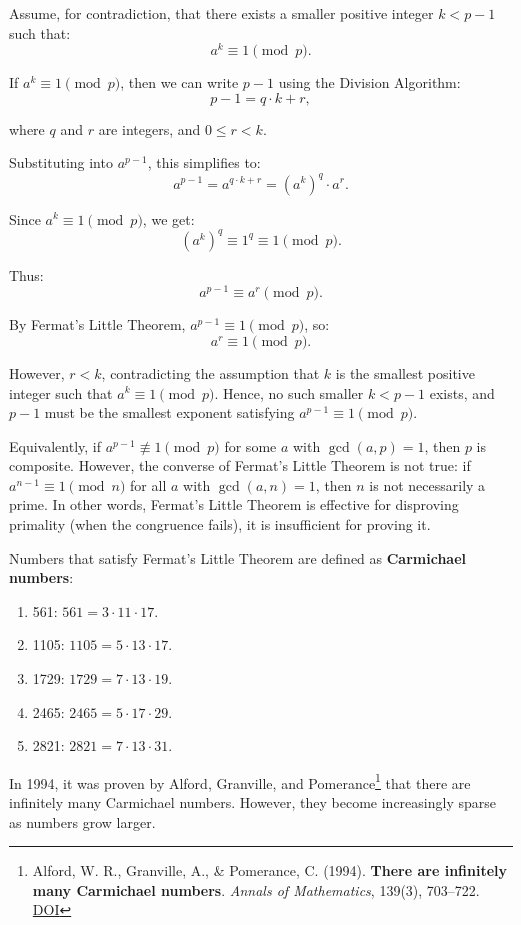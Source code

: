 \documentclass[
  letterpaper,
  DIV=11,
  numbers=noendperiod,
  oneside]{scrartcl}
\providecommand{\tightlist}{%
  \setlength{\itemsep}{0pt}\setlength{\parskip}{0pt}}\usepackage{longtable,booktabs,array}
\begin{document}
Assume, for contradiction, that there exists a smaller positive integer
\(k < p-1\) such that: \[
a^k \equiv 1 \pmod{p}.
\]

If \(a^k \equiv 1 \pmod{p}\), then we can write \(p-1\) using the
Division Algorithm: \[
p-1 = q \cdot k + r,
\]

where \(q\) and \(r\) are integers, and \(0 \leq r < k\).

Substituting into \(a^{p-1}\), this simplifies to: \[
a^{p-1} = a^{q \cdot k + r} = (a^k)^q \cdot a^r.
\]

Since \(a^k \equiv 1 \pmod{p}\), we get: \[
(a^k)^q \equiv 1^q \equiv 1 \pmod{p}.
\]

Thus: \[
a^{p-1} \equiv a^r \pmod{p}.
\]

By Fermat's Little Theorem, \(a^{p-1} \equiv 1 \pmod{p}\), so: \[
a^r \equiv 1 \pmod{p}.
\]

However, \(r < k\), contradicting the assumption that \(k\) is the
smallest positive integer such that \(a^k \equiv 1 \pmod{p}\). Hence, no
such smaller \(k < p-1\) exists, and \(p-1\) must be the smallest
exponent satisfying \(a^{p-1} \equiv 1 \pmod{p}\).

Equivalently, if \(a^{p-1} \not\equiv 1 \pmod{p}\) for some \(a\) with
\(\gcd(a, p) = 1\), then \(p\) is composite. However, the converse of
Fermat's Little Theorem is not true: if \(a^{n-1} \equiv 1 \pmod{n}\)
for all \(a\) with \(\gcd(a, n) = 1\), then \(n\) is not necessarily a
prime. In other words, Fermat's Little Theorem is effective for
disproving primality (when the congruence fails), it is insufficient for
proving it.

Numbers that satisfy Fermat's Little Theorem are defined as
\textbf{Carmichael numbers}:

\begin{enumerate}
\def\labelenumi{\arabic{enumi}.}
\tightlist
\item
  561: \(561 = 3 \cdot 11 \cdot 17\).
\item
  1105: \(1105 = 5 \cdot 13 \cdot 17\).
\item
  1729: \(1729 = 7 \cdot 13 \cdot 19\).
\item
  2465: \(2465 = 5 \cdot 17 \cdot 29\).
\item
  2821: \(2821 = 7 \cdot 13 \cdot 31\).
\end{enumerate}

In 1994, it was proven by Alford, Granville, and Pomerance\footnote{Alford,
  W. R., Granville, A., \& Pomerance, C. (1994). \textbf{There are
  infinitely many Carmichael numbers}. \emph{Annals of Mathematics},
  139(3), 703--722. \href{https://doi.org/10.2307/2118576}{DOI}} that
there are infinitely many Carmichael numbers. However, they become
increasingly sparse as numbers grow larger.
\end{document}
